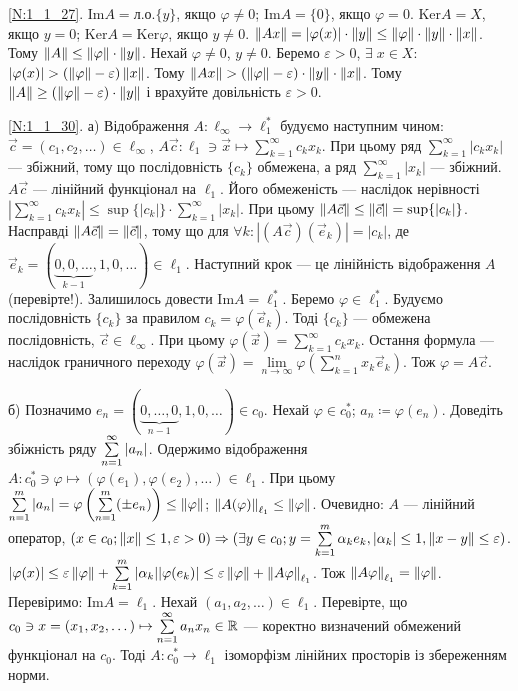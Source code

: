 \noindent\ref{N:1_1_27}. $\mathrm{Im}A = \text{л.о.}\{y\}$, якщо $\varphi \neq 0$;
$\mathrm{Im}A = \{0\}$, якщо $\varphi = 0$. $\mathrm{Ker}A = X$, якщо $y = 0$;
$\mathrm{Ker}A = \mathrm{Ker}\varphi$, якщо $y \neq 0$.
$\left\lVert Ax\right\rVert = |\varphi(x)|\cdot \left\lVert y\right\rVert \leq \left\lVert\varphi\right\rVert\cdot\left\lVert y\right\rVert\cdot\left\lVert x\right\rVert$.
Тому $\left\lVert A\right\rVert \leq \left\lVert\varphi\right\rVert\cdot\left\lVert y\right\rVert$. Нехай $\varphi \neq 0$, $y \neq 0$.
Беремо $\varepsilon > 0$, $\exists\; x \in X$: $|\varphi(x)| > (\left\lVert\varphi\right\rVert-\varepsilon)
\left\lVert x\right\rVert$. Тому $\left\lVert Ax\right\rVert > (\left\lVert\varphi\right\rVert-\varepsilon)\cdot\left\lVert y\right\rVert\cdot\left\lVert x\right\rVert$.
Тому $\left\lVert A\right\rVert \geq (\left\lVert\varphi\right\rVert-\varepsilon)\cdot\left\lVert y\right\rVert$ і врахуйте довільність 
$\varepsilon>0$.

\noindent\ref{N:1_1_30}. а) Відображення $A: \ell_\infty \to \ell_1^*$
будуємо наступним чином: $\vec{c} = (c_1,c_2,\dots) \in \ell_\infty$,
$A\vec{c}: \ell_1 \ni \vec{x} \mapsto \sum\limits^\infty_{k=1} c_k x_k$.
При цьому ряд $\sum\limits^\infty_{k=1} |c_k x_k|$ --- збіжний, тому що послідовність
$\{c_k\}$ обмежена, а ряд $\sum\limits^\infty_{k=1} |x_k|$ --- збіжний.
$A\vec{c}$ --- лінійний функціонал на $\ell_1$. Його обмеженість --- наслідок нерівності
$|\sum\limits^\infty_{k=1} c_k x_k| \leq \sup\{|c_k|\} \cdot \sum\limits^\infty_{k=1} |x_k|$.
При цьому $\left\lVert A \vec{c}\right\rVert \leq \left\lVert\vec{c}\right\rVert = \sup\{|c_k|\}$. Насправді 
$\left\lVert A \vec{c}\right\rVert = \left\lVert\vec{c}\right\rVert$, тому що для $\forall k: |(A \vec{c})(\vec{e}_k)| = |c_k|$,
де $\vec{e}_k = (\underbrace{0,0,\dots}_{k-1},1,0,\dots) \in \ell_1$.
Наступний крок --- це лінійність відображення $A$ (перевірте!). Залишилось довести
$\mathrm{Im}A = \ell_1^*$. Беремо $\varphi\in \ell_1^*$. Будуємо послідовність $\{c_k\}$
за правилом $c_k = \varphi(\vec{e}_k)$. Тоді $\{c_k\}$ --- обмежена послідовність, 
$\vec{c} \in \ell_\infty$. При цьому $\varphi(\vec{x}) = \sum\limits^\infty_{k=1} c_k x_k$.
Остання формула --- наслідок граничного переходу $\varphi(\vec{x}) = 
\underset{n\to \infty}{\lim} \varphi\left(\sum\limits^n_{k=1} x_k \vec{e}_k\right)$.
Тож $\varphi = A \vec{c}$.

\noindent б) Позначимо $e_n = (\underbrace{0,\dots, 0}_{n-1},1,0,\dots) \in c_0$.
Нехай $\varphi \in c_0^*$; $a_n \coloneqq \varphi(e_n)$. Доведіть збіжність ряду $\sum\limits_{n=1}^{\infty}|a_n|$.
Одержимо відображення $A\!: c_0^* \ni \varphi \mapsto (\varphi(e_1),\varphi(e_2),\dots) \!\in \ell_1$. %
При цьому $\sum\limits_{n=1}^{m}|a_n| = \varphi\left(\sum\limits_{n=1}^{m}(\pm e_n)\right) \leq \left\lVert\varphi\right\rVert$;
$\left\lVert A(\varphi)\right\rVert_{\ell_1} \leq \left\lVert\varphi\right\rVert$. Очевидно: $A$ --- лінійний оператор,
$(x\in c_0; \left\lVert x\right\rVert\leq 1, \varepsilon >0) \Rightarrow (\exists y \in c_0; y= \sum\limits_{k=1}^{m}\alpha_k e_k,
|\alpha_k| \leq 1, \left\lVert x-y\right\rVert\leq \varepsilon)$.
$|\varphi(x)| \leq \varepsilon\left\lVert\varphi\right\rVert + \sum\limits_{k=1}^{m}|\alpha_k| |\varphi(e_k)| \leq
\varepsilon \left\lVert\varphi\right\rVert + \left\lVert A\varphi\right\rVert_{\ell_1}$.
Тож $\left\lVert A\varphi\right\rVert_{\ell_1} = \left\lVert\varphi\right\rVert$. Перевіримо: $\mathrm{Im}A = \ell_1$.
Нехай $(a_1, a_2, \dots) \in \ell_1$. Перевірте, що $c_0 \ni x = (x_1, x_2, \dots) \mapsto
\sum\limits_{n=1}^{\infty}a_n x_n \in \mathbb{R}$ --- коректно визначений обмежений функціонал на $c_0$.
Тоді $A: c_0^* \to \ell_1$ ізоморфізм лінійних просторів із збереженням норми.

